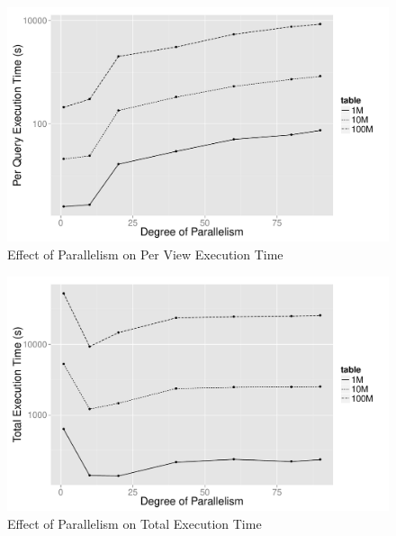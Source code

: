 \begin{figure}[h]

  \centering 
    \includegraphics[width=12cm]{Images/parallelism.pdf}
      \caption{Effect of Parallelism on Per View Execution Time} 
        \label{fig:parallelism}
\end{figure}



\begin{figure}[h]


  \centering
    \includegraphics[width=12cm]{Images/parallelism2.pdf}
  \caption{Effect of Parallelism on Total Execution Time} 
    \label{fig:parallelism_total}
\end{figure}

